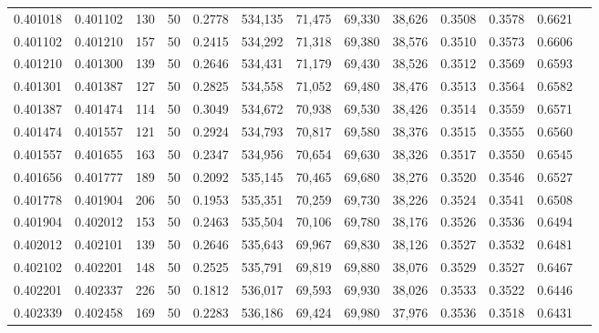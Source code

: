 \begin{tabular}{rrrrrrrrrrrrr}
0.401018 & 0.401102 &   130 &  50 &                                     0.2778 & 534,135 &  71,475 &  69,330 &  38,626 & 0.3508 & 0.3578 & 0.6621 \\
0.401102 & 0.401210 &   157 &  50 &                                     0.2415 & 534,292 &  71,318 &  69,380 &  38,576 & 0.3510 & 0.3573 & 0.6606 \\
0.401210 & 0.401300 &   139 &  50 &                                     0.2646 & 534,431 &  71,179 &  69,430 &  38,526 & 0.3512 & 0.3569 & 0.6593 \\
0.401301 & 0.401387 &   127 &  50 &                                     0.2825 & 534,558 &  71,052 &  69,480 &  38,476 & 0.3513 & 0.3564 & 0.6582 \\
0.401387 & 0.401474 &   114 &  50 &                                     0.3049 & 534,672 &  70,938 &  69,530 &  38,426 & 0.3514 & 0.3559 & 0.6571 \\
0.401474 & 0.401557 &   121 &  50 &                                     0.2924 & 534,793 &  70,817 &  69,580 &  38,376 & 0.3515 & 0.3555 & 0.6560 \\
0.401557 & 0.401655 &   163 &  50 &                                     0.2347 & 534,956 &  70,654 &  69,630 &  38,326 & 0.3517 & 0.3550 & 0.6545 \\
0.401656 & 0.401777 &   189 &  50 &                                     0.2092 & 535,145 &  70,465 &  69,680 &  38,276 & 0.3520 & 0.3546 & 0.6527 \\
0.401778 & 0.401904 &   206 &  50 &                                     0.1953 & 535,351 &  70,259 &  69,730 &  38,226 & 0.3524 & 0.3541 & 0.6508 \\
0.401904 & 0.402012 &   153 &  50 &                                     0.2463 & 535,504 &  70,106 &  69,780 &  38,176 & 0.3526 & 0.3536 & 0.6494 \\
0.402012 & 0.402101 &   139 &  50 &                                     0.2646 & 535,643 &  69,967 &  69,830 &  38,126 & 0.3527 & 0.3532 & 0.6481 \\
0.402102 & 0.402201 &   148 &  50 &                                     0.2525 & 535,791 &  69,819 &  69,880 &  38,076 & 0.3529 & 0.3527 & 0.6467 \\
0.402201 & 0.402337 &   226 &  50 &                                     0.1812 & 536,017 &  69,593 &  69,930 &  38,026 & 0.3533 & 0.3522 & 0.6446 \\
0.402339 & 0.402458 &   169 &  50 &                                     0.2283 & 536,186 &  69,424 &  69,980 &  37,976 & 0.3536 & 0.3518 & 0.6431 \\

\end{tabular}
